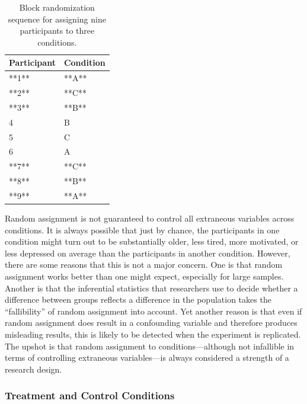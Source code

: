 \documentclass[
]{krantz}
\begin{document}
\begin{table}

\caption{\label{tab:block}Block randomization sequence for assigning nine participants to three conditions.}
\centering
\begin{tabular}[t]{l|l}
\hline
Participant & Condition\\
\hline
**1** & **A**\\
\hline
**2** & **C**\\
\hline
**3** & **B**\\
\hline
4 & B\\
\hline
5 & C\\
\hline
6 & A\\
\hline
**7** & **C**\\
\hline
**8** & **B**\\
\hline
**9** & **A**\\
\hline
\end{tabular}
\end{table}

Random assignment is not guaranteed to control all extraneous variables across conditions. It is always possible that just by chance, the participants in one condition might turn out to be substantially older, less tired, more motivated, or less depressed on average than the participants in another condition. However, there are some reasons that this is not a major concern. One is that random assignment works better than one might expect, especially for large samples. Another is that the inferential statistics that researchers use to decide whether a difference between groups reflects a difference in the population takes the ``fallibility'' of random assignment into account. Yet another reason is that even if random assignment does result in a confounding variable and therefore produces misleading results, this is likely to be detected when the experiment is replicated. The upshot is that random assignment to conditions---although not infallible in terms of controlling extraneous variables---is always considered a strength of a research design.

\hypertarget{treatment-and-control-conditions}{%
\subsubsection*{Treatment and Control Conditions}\label{treatment-and-control-conditions}}
\end{document}
